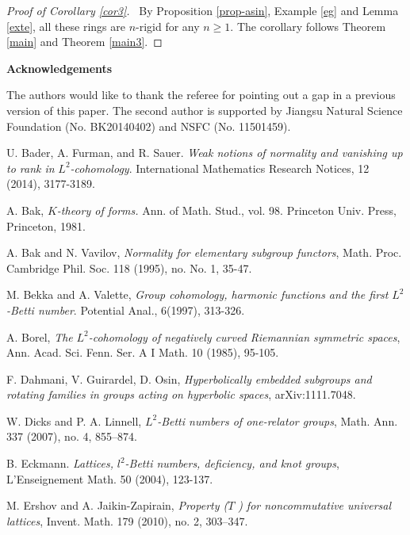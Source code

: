 \documentclass{gtpart}     %
\begin{document}
\bigskip

\begin{proof}[Proof of Corollary \protect\ref{cor3}]
\ By Proposition \ref{prop-asin}, Example \ref{eg} and Lemma \ref{exte}, all
these rings are $n$-rigid for any $n\geq 1.$ The corollary follows Theorem %
\ref{main} and Theorem \ref{main3}.
\end{proof}

\bigskip

\noindent \textbf{Acknowledgements}

The authors would like to thank the referee for pointing out a gap in a
previous version of this paper. The second author is supported by Jiangsu
Natural Science Foundation (No. BK20140402) and NSFC (No. 11501459).

\begin{thebibliography}{99}
 U. Bader, A. Furman, and R. Sauer. \textit{Weak notions of
normality and vanishing up to rank in }$L^{2}$\textit{-cohomology}.
International Mathematics Research Notices, 12 (2014), 3177-3189.

 A. Bak, $K$\textit{-theory of forms.} Ann. of Math. Stud.,
vol. 98. Princeton Univ. Press, Princeton, 1981.

 A. Bak and N. Vavilov, \textit{Normality for elementary
subgroup functors}, Math. Proc. Cambridge Phil. Soc. 118 (1995), no. No. 1,
35-47.

 M. Bekka and A. Valette, \textit{Group cohomology, harmonic
functions and the first }$L^{2}$\textit{-Betti number}. Potential Anal.,
6(1997), 313-326.

 A. Borel, \textit{The }$L^{2}$\textit{-cohomology of negatively
curved Riemannian symmetric spaces}, Ann. Acad. Sci. Fenn. Ser. A I Math. 10
(1985), 95-105.

 F. Dahmani, V. Guirardel, D. Osin, \textit{Hyperbolically
embedded subgroups and rotating families in groups acting on hyperbolic
spaces}, arXiv:1111.7048.

 W. Dicks and P. A. Linnell, $L^{2}$\textit{-Betti numbers of
one-relator groups}, Math. Ann. 337 (2007), no. 4, 855--874.

 B. Eckmann. \textit{Lattices, }$l^{2}$\textit{-Betti numbers,
deficiency, and knot groups}, L'Enseignement Math. 50 (2004), 123-137.

 M. Ershov and A. Jaikin-Zapirain, \textit{Property (}$T$\textit{%
) for noncommutative universal lattices}, Invent. Math. 179 (2010), no. 2,
303--347.


\end{thebibliography}
\end{document}
